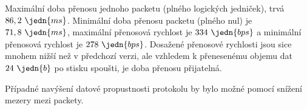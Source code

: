 Maximální doba přenosu jednoho packetu (plného logických jedniček), trvá $86,2~\jedn{ms}$. Minimální doba přenosu packetu (plného nul) je $71,8~\jedn{ms}$, maximální přenosová rychlost je $334~\jedn{bps}$ a minimální přenosová rychlost je $278~\jedn{bps}$. Dosažené přenosové rychlosti jsou sice mnohem nižší než v předchozí verzi, ale vzhledem k přenesenému objemu dat $24~\jedn{b}$ po stisku spoušti, je doba přenosu přijatelná.

Případné navýšení datové propustnosti protokolu by bylo možné pomocí snížení mezery mezi packety.


